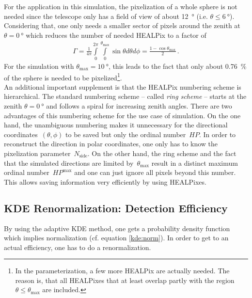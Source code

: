 For the application in this simulation, the pixelization of a whole sphere is not needed since the telescope only has a field of view of about \SI{12}{\degree} (i.e. $\theta \leq \SI{6}{\degree}$). Considering that, one only needs a smaller sector of pixels around the zenith at $\theta = \SI{0}{\degree}$ which reduces the number of needed HEALPix to a factor of
\begin{align}
	\Gamma = \frac{1}{4\pi}\int\limits_{0}^{2\pi}\int\limits_{0}^{\theta_\text{max}}\sin{\theta} d\theta d\phi = \frac{1-\cos\theta_\text{max}}{2}\,.
	\label{eq:spherefactor}
\end{align}
For the \iceact simulation with $\theta_\text{max} = \SI{10}{\degree}$, this leads to the fact that only about \SI{0.76}{\percent} of the sphere is needed to be pixelized\footnote{In the \iceact parameterization, a few more HEALPix are actually needed. The reason is, that all HEALPixes that at least overlap partly with the region $\theta\leq\theta_\text{max}$ are included.}.\\

An additional important supplement is that the HEALPix numbering scheme is hierarchical. The standard numbering scheme -- called \textit{ring scheme} -- starts at the zenith $\theta = \SI{0}{\degree}$ and follows a spiral for increasing zenith angles. There are two advantages of this numbering scheme for the use case of \iceact simulation. On the one hand, the unambiguous numbering makes it unnecessary for the directional coordinates~$(\theta, \phi)$ to be saved but only the ordinal number~$HP$. In order to reconstruct the direction in polar coordinates, one only has to know the pixelization parameter~$N_\text{side}$. On the other hand, the ring scheme and the fact that the simulated directions are limited by~$\theta_\text{max}$ result in a distinct maximum ordinal number~$HP^\text{max}$ and one can just ignore all pixels beyond this number. This allows saving information very efficiently by using HEALPixes. 

\subsection{KDE Renormalization: Detection Efficiency}

By using the adaptive KDE method, one gets a probability density function which implies normalization (cf. equation \eqref{kde:norm}). In order to get to an actual efficiency, one has to do a renormalization.\\

